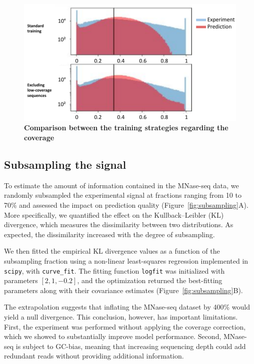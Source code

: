 \documentclass[11pt]{book}
\begin{document}
\begin{figure}[htbp]
    \centering
    \includegraphics[width=\textwidth]{Figures/Results/training low coverage.pdf}
    \caption{\textbf{Comparison between the training strategies regarding the coverage}}
    \label{fig:lowcov_hist}
\end{figure}
  
\subsection{Subsampling the signal}

To estimate the amount of information contained in the MNase-seq data, we randomly subsampled the experimental signal at fractions ranging from 10 to 70\% and assessed the impact on prediction quality (Figure~\ref{fig:subsampling}A). More specifically, we quantified the effect on the Kullback–Leibler (KL) divergence, which measures the dissimilarity between two distributions. As expected, the dissimilarity increased with the degree of subsampling.

We then fitted the empirical KL divergence values as a function of the subsampling fraction using a non-linear least-squares regression implemented in \texttt{scipy}, with \texttt{curve\_fit}. The fitting function \texttt{logfit} was initialized with parameters $[2, 1, -0.2]$, and the optimization returned the best-fitting parameters along with their covariance estimates (Figure~\ref{fig:subsampling}B).

The extrapolation suggests that inflating the MNase-seq dataset by 400\% would yield a null divergence. This conclusion, however, has important limitations. First, the experiment was performed without applying the coverage correction, which we showed to substantially improve model performance. Second, MNase-seq is subject to GC-bias, meaning that increasing sequencing depth could add redundant reads without providing additional information.
\end{document}
